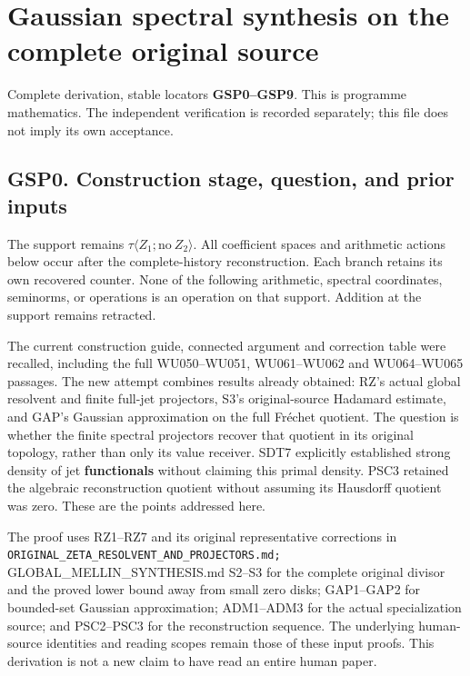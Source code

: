 \section{Gaussian spectral synthesis on the complete original
source}\label{gaussian-spectral-synthesis-on-the-complete-original-source}

Complete derivation, stable locators \textbf{GSP0--GSP9}. This is
programme mathematics. The independent verification is recorded
separately; this file does not imply its own acceptance.

\subsection{GSP0. Construction stage, question, and prior
inputs}\label{gsp0.-construction-stage-question-and-prior-inputs}

The support remains \(\tau\langle Z_1;\mathrm{no}\ Z_2\rangle\). All
coefficient spaces and arithmetic actions below occur after the
complete-history reconstruction. Each branch retains its own recovered
counter. None of the following arithmetic, spectral coordinates,
seminorms, or operations is an operation on that support. Addition at
the support remains retracted.

The current construction guide, connected argument and correction table
were recalled, including the full WU050--WU051, WU061--WU062 and
WU064--WU065 passages. The new attempt combines results already
obtained: RZ's actual global resolvent and finite full-jet projectors,
S3's original-source Hadamard estimate, and GAP's Gaussian approximation
on the full Fréchet quotient. The question is whether the finite
spectral projectors recover that quotient in its original topology,
rather than only its value receiver. SDT7 explicitly established strong
density of jet \textbf{functionals} without claiming this primal
density. PSC3 retained the algebraic reconstruction quotient without
assuming its Hausdorff quotient was zero. These are the points addressed
here.

The proof uses RZ1--RZ7 and its original representative corrections in
\nolinkurl{ORIGINAL_ZETA_RESOLVENT_AND_PROJECTORS.md;}
GLOBAL\_MELLIN\_SYNTHESIS.md S2--S3 for the complete original divisor
and the proved lower bound away from small zero disks; GAP1--GAP2 for
bounded-set Gaussian approximation; ADM1--ADM3 for the actual
specialization source; and PSC2--PSC3 for the reconstruction sequence.
The underlying human-source identities and reading scopes remain those
of these input proofs. This derivation is not a new claim to have read
an entire human paper.

